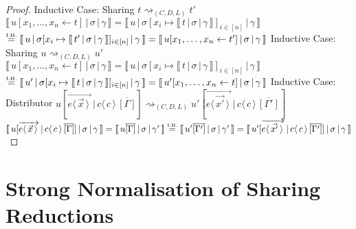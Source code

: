 \documentclass[a4paper,UKenglish,cleveref, autoref]{lipics-v2019}
\newcommand{\share}[3]{#1 [#2 \leftarrow #3]}
\newcommand{\dist}[5]{#1 [ #2 \, \vert \, \fakedist{#4}{#5} \, #3 ]}
\newcommand{\fakedist}[2]{#1 \langle \, #2 \, \rangle}
\newcommand{\vecdist}[2]{\overrightarrow{\fakedist{#1}{#2} \,}}
\newcommand{\readbackwmap}[3]{\llbracket \, #1 \, \vert \, #2 \, \vert \, #3  \, \rrbracket }
\newcommand{\IH}{\stackrel{\hbox{\tiny I.H.}}{\hbox{=}}}
\begin{document}
\begin{proof}
Inductive Case: Sharing $t \rightsquigarrow_{(C, D, L)} t'$
\newline
$\readbackwmap{\share{u}{x_{1}, \dots, x_{n}}{t}}{\sigma}{\gamma} = \readbackwmap{u}{\sigma[x_{i} \mapsto \readbackwmap{t}{\sigma}{\gamma}]_{i \in [n]}}{\gamma}$
\newline
$\IH \readbackwmap{u}{\sigma[x_{i} \mapsto \readbackwmap{t'}{\sigma}{\gamma}]_{i \in [n]}}{\gamma} = \readbackwmap{\share{u}{x_{1}, \dots, x_{n}}{t'}}{\sigma}{\gamma}$
\newline
\newline
Inductive Case: Sharing $u \rightsquigarrow_{(C, D, L)} u'$
\newline
$\readbackwmap{\share{u}{x_{1}, \dots, x_{n}}{t}}{\sigma}{\gamma} = \readbackwmap{u}{\sigma[x_{i} \mapsto \readbackwmap{t}{\sigma}{\gamma}]_{i \in [n]}}{\gamma}$
\newline
$\IH \readbackwmap{u'}{\sigma[x_{i} \mapsto \readbackwmap{t}{\sigma}{\gamma}]_{i \in [n]}}{\gamma} = \readbackwmap{\share{u'}{x_{1}, \dots, x_{n}}{t}}{\sigma}{\gamma}$
\newline
\newline
Inductive Case: Distributor $\dist{u}{\vecdist{e}{\vec{x}}}{\overline{[\Gamma]}}{c}{c} \rightsquigarrow_{(C, D, L)} \dist{u'}{\vecdist{e}{\vec{x'}}}{\overline{[\Gamma']}}{c}{c}$
\newline
$\readbackwmap{\dist{u}{\vecdist{e}{\vec{x}}}{\overline{[\Gamma]}}{c}{c}}{\sigma}{\gamma} = \readbackwmap{u \overline{[\Gamma]}}{\sigma}{\gamma'} \IH \readbackwmap{u' \overline{[\Gamma']}}{\sigma}{\gamma'} = \readbackwmap{\dist{u'}{\vecdist{e}{\vec{x'}}}{\overline{[\Gamma']}}{c}{c}}{\sigma}{\gamma}$
\end{proof}

\newpage

\section{Strong Normalisation of Sharing Reductions}
\end{document}
